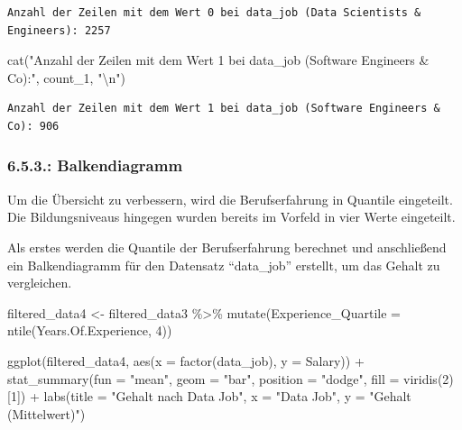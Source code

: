 \documentclass[
  letterpaper,
  DIV=11,
  numbers=noendperiod]{scrartcl}
\newenvironment{Shaded}{\begin{snugshade}}{\end{snugshade}}
\newcommand{\AttributeTok}[1]{\textcolor[rgb]{0.40,0.45,0.13}{#1}}
\newcommand{\DecValTok}[1]{\textcolor[rgb]{0.68,0.00,0.00}{#1}}
\newcommand{\FunctionTok}[1]{\textcolor[rgb]{0.28,0.35,0.67}{#1}}
\newcommand{\NormalTok}[1]{\textcolor[rgb]{0.00,0.23,0.31}{#1}}
\newcommand{\OtherTok}[1]{\textcolor[rgb]{0.00,0.23,0.31}{#1}}
\newcommand{\SpecialCharTok}[1]{\textcolor[rgb]{0.37,0.37,0.37}{#1}}
\newcommand{\StringTok}[1]{\textcolor[rgb]{0.13,0.47,0.30}{#1}}
\begin{document}
\begin{verbatim}
Anzahl der Zeilen mit dem Wert 0 bei data_job (Data Scientists & Engineers): 2257 
\end{verbatim}

\begin{Shaded}
\begin{Highlighting}[]
\FunctionTok{cat}\NormalTok{(}\StringTok{"Anzahl der Zeilen mit dem Wert 1 bei data\_job (Software Engineers \& Co):"}\NormalTok{, count\_1, }\StringTok{"}\SpecialCharTok{\textbackslash{}n}\StringTok{"}\NormalTok{)}
\end{Highlighting}
\end{Shaded}

\begin{verbatim}
Anzahl der Zeilen mit dem Wert 1 bei data_job (Software Engineers & Co): 906 
\end{verbatim}

\hypertarget{balkendiagramm}{%
\subsubsection{6.5.3.: Balkendiagramm}\label{balkendiagramm}}

Um die Übersicht zu verbessern, wird die Berufserfahrung in Quantile
eingeteilt. Die Bildungsniveaus hingegen wurden bereits im Vorfeld in
vier Werte eingeteilt.

Als erstes werden die Quantile der Berufserfahrung berechnet und
anschließend ein Balkendiagramm für den Datensatz ``data\_job''
erstellt, um das Gehalt zu vergleichen.

\begin{Shaded}
\begin{Highlighting}[]
\NormalTok{filtered\_data4 }\OtherTok{\textless{}{-}}\NormalTok{ filtered\_data3 }\SpecialCharTok{\%\textgreater{}\%}
  \FunctionTok{mutate}\NormalTok{(}\AttributeTok{Experience\_Quartile =} \FunctionTok{ntile}\NormalTok{(Years.Of.Experience, }\DecValTok{4}\NormalTok{))}

\FunctionTok{ggplot}\NormalTok{(filtered\_data4, }\FunctionTok{aes}\NormalTok{(}\AttributeTok{x =} \FunctionTok{factor}\NormalTok{(data\_job), }\AttributeTok{y =}\NormalTok{ Salary)) }\SpecialCharTok{+}
  \FunctionTok{stat\_summary}\NormalTok{(}\AttributeTok{fun =} \StringTok{"mean"}\NormalTok{, }\AttributeTok{geom =} \StringTok{"bar"}\NormalTok{, }\AttributeTok{position =} \StringTok{"dodge"}\NormalTok{, }\AttributeTok{fill =} \FunctionTok{viridis}\NormalTok{(}\DecValTok{2}\NormalTok{)[}\DecValTok{1}\NormalTok{]) }\SpecialCharTok{+}
  \FunctionTok{labs}\NormalTok{(}\AttributeTok{title =} \StringTok{"Gehalt nach Data Job"}\NormalTok{,}
       \AttributeTok{x =} \StringTok{"Data Job"}\NormalTok{,}
       \AttributeTok{y =} \StringTok{"Gehalt (Mittelwert)"}\NormalTok{)}
\end{Highlighting}
\end{Shaded}
\end{document}
